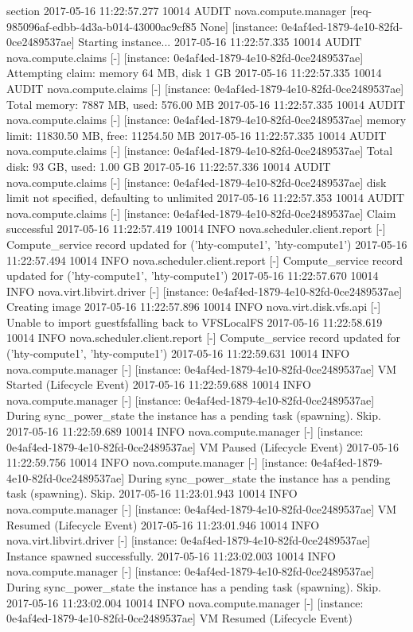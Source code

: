 \documentclass[a4paper,left=1.5cm,right=1.5cm,11pt]{article}
\begin{document}
\tableofcontents

\clearpage

section{}
2017-05-16 11:22:57.277 10014 AUDIT nova.compute.manager [req-985096af-edbb-4d3a-b014-43000ac9cf85 None] [instance: 0e4af4ed-1879-4e10-82fd-0ce2489537ae] Starting instance...
2017-05-16 11:22:57.335 10014 AUDIT nova.compute.claims [-] [instance: 0e4af4ed-1879-4e10-82fd-0ce2489537ae] Attempting claim: memory 64 MB, disk 1 GB
2017-05-16 11:22:57.335 10014 AUDIT nova.compute.claims [-] [instance: 0e4af4ed-1879-4e10-82fd-0ce2489537ae] Total memory: 7887 MB, used: 576.00 MB
2017-05-16 11:22:57.335 10014 AUDIT nova.compute.claims [-] [instance: 0e4af4ed-1879-4e10-82fd-0ce2489537ae] memory limit: 11830.50 MB, free: 11254.50 MB
2017-05-16 11:22:57.335 10014 AUDIT nova.compute.claims [-] [instance: 0e4af4ed-1879-4e10-82fd-0ce2489537ae] Total disk: 93 GB, used: 1.00 GB
2017-05-16 11:22:57.336 10014 AUDIT nova.compute.claims [-] [instance: 0e4af4ed-1879-4e10-82fd-0ce2489537ae] disk limit not specified, defaulting to unlimited
2017-05-16 11:22:57.353 10014 AUDIT nova.compute.claims [-] [instance: 0e4af4ed-1879-4e10-82fd-0ce2489537ae] Claim successful
2017-05-16 11:22:57.419 10014 INFO nova.scheduler.client.report [-] Compute_service record updated for ('hty-compute1', 'hty-compute1')
2017-05-16 11:22:57.494 10014 INFO nova.scheduler.client.report [-] Compute_service record updated for ('hty-compute1', 'hty-compute1')
2017-05-16 11:22:57.670 10014 INFO nova.virt.libvirt.driver [-] [instance: 0e4af4ed-1879-4e10-82fd-0ce2489537ae] Creating image
2017-05-16 11:22:57.896 10014 INFO nova.virt.disk.vfs.api [-] Unable to import guestfsfalling back to VFSLocalFS
2017-05-16 11:22:58.619 10014 INFO nova.scheduler.client.report [-] Compute_service record updated for ('hty-compute1', 'hty-compute1')
2017-05-16 11:22:59.631 10014 INFO nova.compute.manager [-] [instance: 0e4af4ed-1879-4e10-82fd-0ce2489537ae] VM Started (Lifecycle Event)
2017-05-16 11:22:59.688 10014 INFO nova.compute.manager [-] [instance: 0e4af4ed-1879-4e10-82fd-0ce2489537ae] During sync_power_state the instance has a pending task (spawning). Skip.
2017-05-16 11:22:59.689 10014 INFO nova.compute.manager [-] [instance: 0e4af4ed-1879-4e10-82fd-0ce2489537ae] VM Paused (Lifecycle Event)
2017-05-16 11:22:59.756 10014 INFO nova.compute.manager [-] [instance: 0e4af4ed-1879-4e10-82fd-0ce2489537ae] During sync_power_state the instance has a pending task (spawning). Skip.
2017-05-16 11:23:01.943 10014 INFO nova.compute.manager [-] [instance: 0e4af4ed-1879-4e10-82fd-0ce2489537ae] VM Resumed (Lifecycle Event)
2017-05-16 11:23:01.946 10014 INFO nova.virt.libvirt.driver [-] [instance: 0e4af4ed-1879-4e10-82fd-0ce2489537ae] Instance spawned successfully.
2017-05-16 11:23:02.003 10014 INFO nova.compute.manager [-] [instance: 0e4af4ed-1879-4e10-82fd-0ce2489537ae] During sync_power_state the instance has a pending task (spawning). Skip.
2017-05-16 11:23:02.004 10014 INFO nova.compute.manager [-] [instance: 0e4af4ed-1879-4e10-82fd-0ce2489537ae] VM Resumed (Lifecycle Event)

	
\end{document}
